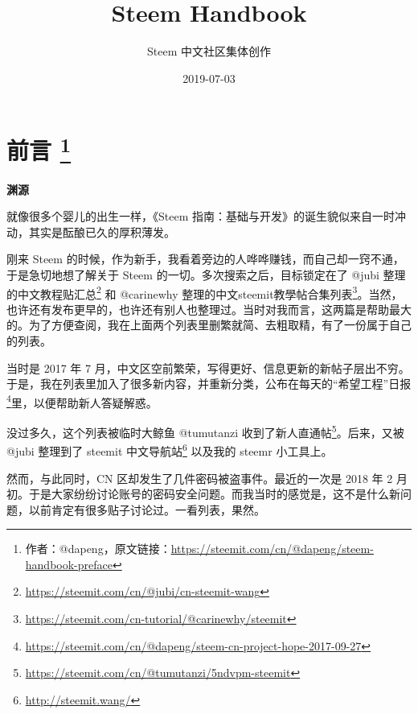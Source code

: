 \documentclass[]{ctexbook}
\title{Steem Handbook}
\author{Steem 中文社区集体创作}
\date{2019-07-03}
\renewcommand{\href}[2]{#2\footnote{\url{#1}}}
\begin{document}

\begin{titlepage}

\end{titlepage}

\setlength{\abovedisplayskip}{-5pt}
\setlength{\abovedisplayshortskip}{-5pt}

{
\setcounter{tocdepth}{1}
\tableofcontents
}


\hypertarget{index}{%
\chapter*{\texorpdfstring{前言 \footnote{作者：@dapeng，原文链接：\url{https://steemit.com/cn/@dapeng/steem-handbook-preface}}}{前言 }}\label{index}}

\textbf{渊源}

就像很多个婴儿的出生一样，《Steem 指南：基础与开发》的诞生貌似来自一时冲动，其实是酝酿已久的厚积薄发。

刚来 Steem 的时候，作为新手，我看着旁边的人哗哗赚钱，而自己却一窍不通，于是急切地想了解关于 Steem 的一切。多次搜索之后，目标锁定在了 @jubi 整理的\href{https://steemit.com/cn/@jubi/cn-steemit-wang}{中文教程贴汇总} 和 @carinewhy 整理的\href{https://steemit.com/cn-tutorial/@carinewhy/steemit}{中文steemit教學帖合集列表}。当然，也许还有发布更早的，也许还有别人也整理过。当时对我而言，这两篇是帮助最大的。为了方便查阅，我在上面两个列表里删繁就简、去粗取精，有了一份属于自己的列表。

当时是 2017 年 7 月，中文区空前繁荣，写得更好、信息更新的新帖子层出不穷。于是，我在列表里加入了很多新内容，并重新分类，公布在每天的\href{https://steemit.com/cn/@dapeng/steem-cn-project-hope-2017-09-27}{``希望工程''日报}里，以便帮助新人答疑解惑。

没过多久，这个列表被临时大鲸鱼 @tumutanzi 收到了\href{https://steemit.com/cn/@tumutanzi/5ndvpm-steemit}{新人直通帖}。后来，又被 @jubi 整理到了 \href{http://steemit.wang/}{steemit 中文导航站} 以及我的 steemr 小工具上。

然而，与此同时，CN 区却发生了几件密码被盗事件。最近的一次是 2018 年 2 月初。于是大家纷纷讨论账号的密码安全问题。而我当时的感觉是，这不是什么新问题，以前肯定有很多贴子讨论过。一看列表，果然。
\end{document}
